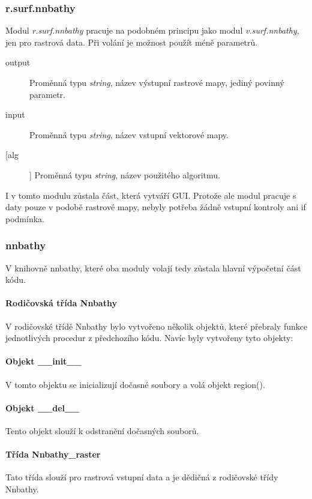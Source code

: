 \documentclass[12pt,a4paper]{article}
\begin{document}
\subsubsection{r.surf.nnbathy}
Modul \emph{r.surf.nnbathy} pracuje na podobném principu jako modul \emph{v.surf.nnbathy}, jen pro rastrová data. Při volání je možnost použít méně parametrů.
\begin{description}
\item[output] Proměnná typu \emph{string}, název výstupní rastrové mapy, jediný povinný parametr.
\item[input] Proměnná typu \emph{string}, název vstupní vektorové mapy.
\item[[alg]] Proměnná typu \emph{string}, název použitého algoritmu.
\end{description}


I v tomto modulu zůstala část, která vytváří GUI. Protože ale modul pracuje s daty pouze v podobě rastrové mapy, nebyly potřeba žádně vstupní kontroly ani if podmínka.

\newpage
\subsubsection{nnbathy}
V knihovně nnbathy, které oba moduly volají tedy zůstala hlavní výpočetní část kódu. 

\paragraph{Rodičovská třída Nnbathy} V rodičovské třídě Nnbathy bylo vytvořeno několik objektů, které přebraly funkce jednotlivých procedur z předchozího kódu. Navíc byly vytvořeny tyto objekty:

\paragraph{Objekt \_\_init\_\_}
V tomto objektu se inicializují dočasné soubory a volá objekt region().

\paragraph{Objekt \_\_del\_\_}
Tento objekt slouží k odstranění dočasných souborů.

\paragraph{Třída Nnbathy\_raster}
Tato třída slouží pro rastrová vstupní data a je dědičná z rodičovské třídy Nnbathy.
\end{document}

